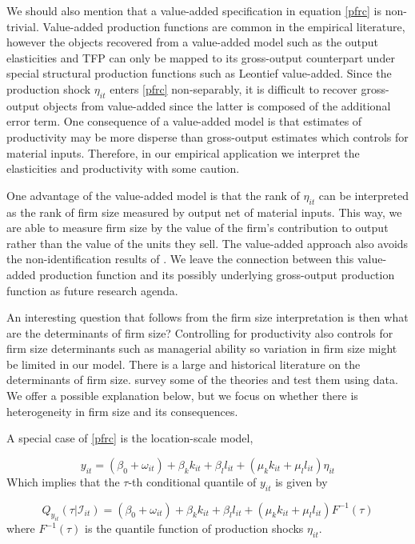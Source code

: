 \documentclass[11pt]{article}
\begin{document}
We should also mention that a value-added specification in equation \eqref{pfrc} is non-trivial. Value-added production functions are common in the empirical literature, however the objects recovered from a value-added model such as the output elasticities and TFP can only be mapped to its gross-output counterpart under special structural production functions such as Leontief value-added. Since the production shock $\eta_{it}$ enters \eqref{pfrc} non-separably, it is difficult to recover gross-output objects from value-added since the latter is composed of the additional error term. One consequence of a value-added model is that estimates of productivity may be more disperse than gross-output estimates which controls for material inputs. Therefore, in our empirical application we interpret the elasticities and productivity with some caution.

 One advantage of the value-added model is that the rank of $\eta_{it}$ can be interpreted as the rank of firm size measured by output net of material inputs. This way, we are able to measure firm size by the value of the firm's contribution to output rather than the value of the units they sell. The value-added approach also avoids the non-identification results of \cite{Gandhi2020}. We leave the connection between this value-added production function and its possibly underlying gross-output production function as future research agenda.

 An interesting question that follows from the firm size interpretation is then what are the determinants of firm size? Controlling for productivity also controls for firm size determinants such as managerial ability so variation in firm size might be limited in our model. There is a large and historical literature on the determinants of firm size. \cite{Kumar1999} survey some of the theories and test them using data. We offer a possible explanation below, but we focus on whether there is heterogeneity in firm size and its consequences. 

A special case of \eqref{pfrc} is the location-scale model,

\begin{equation} \label{locationscale}
    y_{it}=(\beta_{0}+\omega_{it})+\beta_{k}k_{it}+\beta_{l}l_{it}+(\mu_{k}k_{it}+\mu_{l}l_{it})\eta_{it}
\end{equation}
Which implies that the $\tau$-th conditional quantile of $y_{it}$ is given by

\begin{equation}
Q_{y_{it}}(\tau|\mathcal{I}_{it})=(\beta_{0}+\omega_{it})+\beta_{k}k_{it}+\beta_{l}l_{it}+(\mu_{k}k_{it}+\mu_{l}l_{it})F^{-1}(\tau)
\end{equation}
where $F^{-1}(\tau)$ is the quantile function of production shocks $\eta_{it}$.
\end{document}
